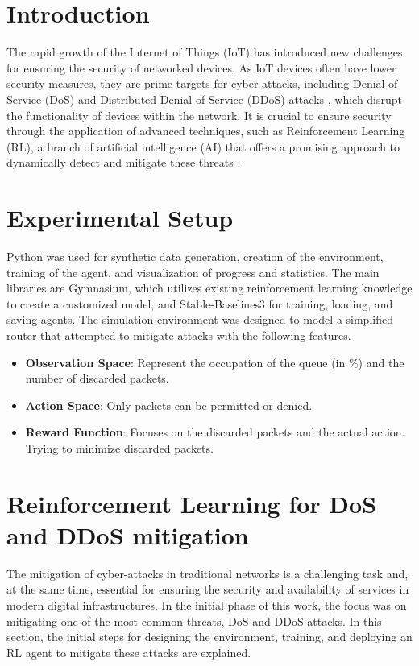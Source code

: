 \documentclass[runningheads]{llncs}
\begin{document}
\section{Introduction}

The rapid growth of the Internet of Things (IoT) has introduced new challenges for ensuring the security of networked devices. As IoT devices often have lower security measures, they are prime targets for cyber-attacks, including Denial of Service (DoS) and Distributed Denial of Service (DDoS) attacks \cite{Liu2018} \cite{Yungaicela-Naula2022}, which disrupt the functionality of devices within the network. It is crucial to ensure security through the application of advanced techniques, such as Reinforcement Learning (RL), a branch of artificial intelligence (AI) that offers a promising approach to dynamically detect and mitigate these threats \cite{Gasmi2023} \cite{Sewak2023}.

\section{Experimental Setup }
Python was used for synthetic data generation, creation of the environment, training of the agent, and visualization of progress and statistics.
The main libraries are Gymnasium, which utilizes existing reinforcement learning knowledge to create a customized model, and Stable-Baselines3 for training, loading, and saving agents.
The simulation environment was designed to model a simplified router that attempted to mitigate attacks with the following features.
 \begin{itemize}
     \item \textbf{Observation Space}: Represent the occupation of the queue (in \%) and the number of discarded packets.
     \item \textbf{Action Space}: Only packets can be permitted or denied.
     \item \textbf{Reward Function}: Focuses on the discarded packets and the actual action. Trying to minimize discarded packets.
  \end{itemize}
\section{Reinforcement Learning for DoS and DDoS mitigation}
The mitigation of cyber-attacks in traditional networks is a challenging task and, at the same time, essential for ensuring the security and availability of services in modern digital infrastructures. In the initial phase of this work, the focus was on mitigating one of the most common threats, DoS and DDoS attacks. In this section, the initial steps for designing the environment, training, and deploying an RL agent to mitigate these attacks are explained.
 
\end{document}
